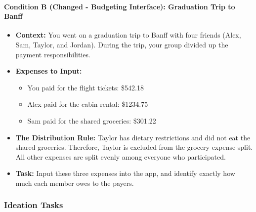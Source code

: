 \documentclass[12pt,a4paper]{article}
\begin{document}
\paragraph{Condition B (Changed - Budgeting Interface): Graduation Trip to Banff}
\begin{itemize}
    \item \textbf{Context: }You went on a graduation trip to Banff with four friends (Alex, Sam, Taylor, and Jordan). During the trip, your group divided up the payment responsibilities.
    
    \item {\textbf{Expenses to Input:}
    \begin{itemize}
        \item You paid for the flight tickets: \$542.18
        \item Alex paid for the cabin rental: \$1234.75
        \item Sam paid for the shared groceries: \$301.22
    \end{itemize}
    }
    
    \item \textbf{The Distribution Rule:} Taylor has dietary restrictions and did not eat the shared groceries. Therefore, Taylor is excluded from the grocery expense split. All other expenses are split evenly among everyone who participated.
    
    \item \textbf{Task:} Input these three expenses into the app, and identify exactly how much each member owes to the payers.
\end{itemize}

\subsubsection{Ideation Tasks}
\end{document}
